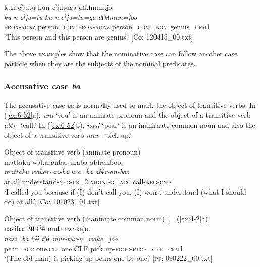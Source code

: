 \ex
{\TM}
\glll kun  cˀjutu  kun  cˀjutuga  dɨkɨmun.jo.\\
\textit{ku-n}  \textit{cˀju=tu}  \textit{ku-n}  \textit{cˀju=tu=ga} \textit{dɨkɨmun=joo}\\
\textsc{prox}-\textsc{adnz}  person=\textsc{com}  \textsc{prox}-\textsc{adnz}  person=\textsc{com}=\textsc{nom}   genius=\textsc{cfm}1\\

\glt ‘This person and this person are genius.’ [Co: 120415\_00.txt]
\z
\z

The above examples show that the nominative case can follow another case particle when they are the subjects of the nominal predicates.

\subsubsection{Accusative case \textit{ba}}

The accusative case \textit{ba} is normally used to mark the object of transitive verbs. In (\ref{ex:6-52}a), \textit{ura} ‘you’ is an animate pronoun and the object of a transitive verb \textit{abɨr-} ‘call.’ In (\ref{ex:6-52}b), \textit{nasi} ‘pear’ is an inanimate common noun and also the object of a transitive verb \textit{mur-} ‘pick up.’

\ea\label{ex:6-52}
\ea Object of transitive verb (animate pronoun)\\
{\TM}
\glll  mattaku  wakaranba,  uraba  abɨranboo.\\
\textit{mattaku}  \textit{wakar-an-ba}  \textit{ura=ba}  \textit{abɨr-an-boo}\\
at.all  understand-\textsc{neg}-\textsc{csl}  2.\textsc{nhon}.\textsc{sg}=\textsc{acc}  call-\textsc{neg}-\textsc{cnd}\\
\glt ‘I called you because if (I) don’t call you, (I) won’t understand (what I should do) at all.’ [Co: 101023\_01.txt]

\ex Object of transitive verb (inanimate common noun) [= (\ref{ex:4-2}a)]\\
{\TM}
\glll  nasiba  tˀɨɨ  tˀɨɨ  mutunwakejo.\\
\textit{nasi=ba}  \textit{tˀɨɨ}  \textit{tˀɨɨ}  \textit{mur-tur-n=wake=joo}\\
pear=\textsc{acc}  one.\textsc{clf}  one.CLF  pick.up-\textsc{prog}-\textsc{ptcp}=\textsc{cfp}=\textsc{cfm}1\\
\glt ‘(The old man) is picking up pears one by one.’ [\textsc{pf}: 090222\_00.txt]
\z
\z

